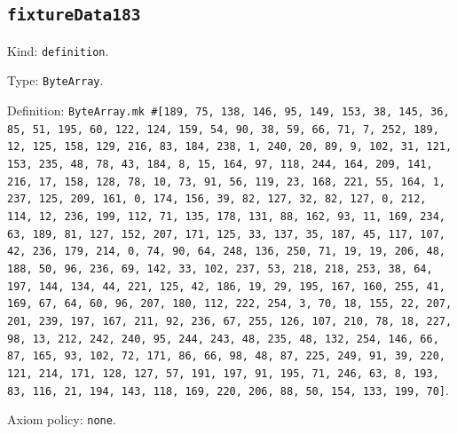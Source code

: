 \documentclass[11pt]{article}
\begin{document}
\subsection*{\texttt{fixtureData183}}
\noindent Kind: \texttt{definition}.\par
\noindent Type: \texttt{ByteArray}.\par
\noindent Definition: \texttt{ByteArray.mk \#[189, 75, 138, 146, 95, 149, 153, 38, 145, 36, 85, 51, 195, 60, 122, 124, 159, 54, 90, 38, 59, 66, 71, 7, 252, 189, 12, 125, 158, 129, 216, 83, 184, 238, 1, 240, 20, 89, 9, 102, 31, 121, 153, 235, 48, 78, 43, 184, 8, 15, 164, 97, 118, 244, 164, 209, 141, 216, 17, 158, 128, 78, 10, 73, 91, 56, 119, 23, 168, 221, 55, 164, 1, 237, 125, 209, 161, 0, 174, 156, 39, 82, 127, 32, 82, 127, 0, 212, 114, 12, 236, 199, 112, 71, 135, 178, 131, 88, 162, 93, 11, 169, 234, 63, 189, 81, 127, 152, 207, 171, 125, 33, 137, 35, 187, 45, 117, 107, 42, 236, 179, 214, 0, 74, 90, 64, 248, 136, 250, 71, 19, 19, 206, 48, 188, 50, 96, 236, 69, 142, 33, 102, 237, 53, 218, 218, 253, 38, 64, 197, 144, 134, 44, 221, 125, 42, 186, 19, 29, 195, 167, 160, 255, 41, 169, 67, 64, 60, 96, 207, 180, 112, 222, 254, 3, 70, 18, 155, 22, 207, 201, 239, 197, 167, 211, 92, 236, 67, 255, 126, 107, 210, 78, 18, 227, 98, 13, 212, 242, 240, 95, 244, 243, 48, 235, 48, 132, 254, 146, 66, 87, 165, 93, 102, 72, 171, 86, 66, 98, 48, 87, 225, 249, 91, 39, 220, 121, 214, 171, 128, 127, 57, 191, 197, 91, 195, 71, 246, 63, 8, 193, 83, 116, 21, 194, 143, 118, 169, 220, 206, 88, 50, 154, 133, 199, 70]}.\par
\noindent Axiom policy: \texttt{none}.\par
\end{document}
